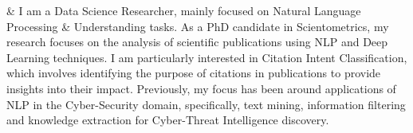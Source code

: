 %
\color{gray}{Summary}
& I am a Data Science Researcher, mainly focused on Natural Language Processing \& Understanding tasks. 
As a PhD candidate in Scientometrics, my research focuses on the analysis of scientific publications using NLP and Deep Learning techniques. 
I am particularly interested in Citation Intent Classification, which involves identifying the purpose of citations in publications to provide insights into their impact. Previously, my focus has been around applications of NLP in the Cyber-Security domain, specifically, text mining, information filtering and knowledge extraction for Cyber-Threat Intelligence discovery. \\